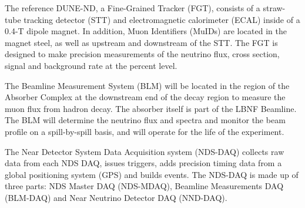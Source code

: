 The reference DUNE-ND, a Fine-Grained Tracker (FGT),
consists of a straw-tube tracking detector (STT) and electromagnetic
calorimeter (ECAL) inside of a 0.4-T dipole magnet. In addition, Muon
Identifiers (MuIDs) are located in the magnet steel, as well as
upstream and downstream of the STT. The FGT is designed to make
precision measurements of the neutrino flux, cross section, signal
and background rate at the percent level.  

The Beamline Measurement System (BLM) will be located in the region of
the Absorber Complex at the downstream end of the decay region to
measure the muon flux from hadron decay. The absorber itself is part
of the LBNF Beamline.  The BLM will determine the neutrino
flux and spectra and monitor the beam profile on a spill-by-spill
basis, and will operate for the life of the experiment.

The Near Detector System Data Acquisition system (NDS-DAQ) collects
raw data from each NDS DAQ, issues triggers,
adds precision timing data from a global positioning system (GPS) and
builds events.  The NDS-DAQ is made up of three parts: NDS Master DAQ
(NDS-MDAQ), Beamline Measurements DAQ (BLM-DAQ) and Near
Neutrino Detector DAQ (NND-DAQ).
